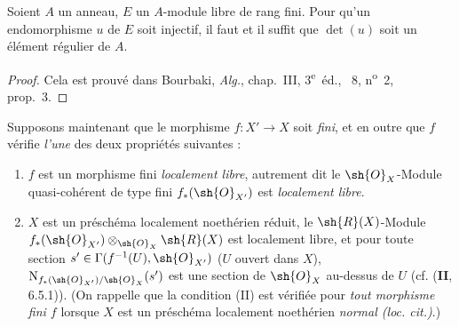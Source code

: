 \begin{lemma}[21.5.2]
\label{IV.21.5.2}
Soient $A$ un anneau, $E$ un $A$-module libre de rang fini.
Pour qu'un endomorphisme $u$ de $E$ soit injectif, il faut et il suffit que $\det(u)$ soit un élément régulier de $A$.
\end{lemma}

\begin{proof}
Cela est prouvé dans Bourbaki, \emph{Alg.}, chap.~III, 3\textsuperscript{e}~éd., \textsection~8, n\textsuperscript{o}~2, prop.~3.
\end{proof}

\begin{env}[21.5.3]
Supposons maintenant que le morphisme $f:X'\to X$ soit \emph{fini}, et en outre que $f$ vérifie \emph{l'une} des deux propriétés suivantes :
\begin{enumerate}[label=\Roman*)]
  \item $f$ est un morphisme fini \emph{localement libre}, autrement dit  le $\sh{O}_X$-Module quasi-cohérent de type fini $f_*(\sh{O}_{X'})$ est \emph{localement libre}.
  \item $X$ est un préschéma localement noethérien réduit, le $\sh{R}(X)$-Module $f_*(\sh{O}_{X'})\otimes_{\sh{O}_X}\sh{R}(X)$ est localement libre, et pour toute section $s'\in\Gamma(f^{-1}(U),\sh{O}_{X'})$ ($U$ ouvert
  dans $X$), $\mathrm{N}_{f_*(\sh{O}_{X'})/\sh{O}_X}(s')$ est une section de $\sh{O}_X$ au-dessus de $U$ (cf. (\textbf{II}, 6.5.1)).
  (On rappelle que la condition (II) est vérifiée pour \emph{tout morphisme fini $f$} lorsque $X$ est un préschéma localement noethérien \emph{normal (loc. cit.)}.)
\end{enumerate}


\end{env}
